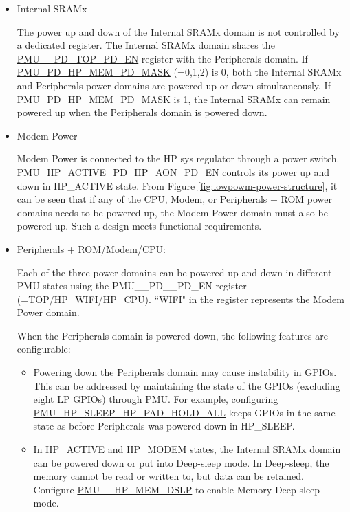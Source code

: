\documentclass[main\_\_EN.tex]{subfiles}
\begin{document}
\begin{itemize}
    \item Internal SRAMx

    The power up and down of the Internal SRAMx domain is not controlled by a dedicated register. The Internal SRAMx domain shares the \hyperref[fielddesc:PMUHPACTIVEPDTOPPDEN]{PMU\_\_PD\_TOP\_PD\_EN} register with the Peripherals domain. If \hyperref[fielddesc:PMUPDHPMEM0PDMASK]{PMU\_PD\_HP\_MEM\_PD\_MASK} (=0,1,2) is 0, both the Internal SRAMx and Peripherals power domains are powered up or down simultaneously. If \hyperref[fielddesc:PMUPDHPMEM0PDMASK]{PMU\_PD\_HP\_MEM\_PD\_MASK} is 1, the Internal SRAMx can remain powered up when the Peripherals domain is powered down.

    \item Modem Power

    Modem Power is connected to the HP sys regulator through a power switch. \hyperref[fielddesc:PMUHPACTIVEPDHPAONPDEN]{PMU\_HP\_ACTIVE\_PD\_HP\_AON\_PD\_EN} controls its power up and down in HP\_ACTIVE state. From Figure \ref{fig:lowpowm-power-structure}, it can be seen that if any of the CPU, Modem, or Peripherals + ROM power domains needs to be powered up, the Modem Power domain must also be powered up. Such a design meets functional requirements.

    \item Peripherals + ROM/Modem/CPU:

    Each of the three power domains can be powered up and down in different PMU states using the PMU\_\_PD\_\_PD\_EN register (=TOP/HP\_WIFI/HP\_CPU). ``WIFI" in the register represents the Modem Power domain.

    When the Peripherals domain is powered down, the following features are configurable:
        \begin{itemize}
        \item Powering down the Peripherals domain may cause instability in GPIOs. This can be addressed by maintaining the state of the GPIOs (excluding eight LP GPIOs) through PMU. For example, configuring \hyperref[fielddesc:PMUHPSLEEPHPPADHOLDALL]{PMU\_HP\_SLEEP\_HP\_PAD\_HOLD\_ALL} keeps GPIOs in the same state as before Peripherals was powered down in HP\_SLEEP.

        \item In HP\_ACTIVE and HP\_MODEM states, the Internal SRAMx domain can be powered down or put into Deep-sleep mode. In Deep-sleep, the memory cannot be read or written to, but data can be retained. Configure \hyperref[fielddesc:PMUHPACTIVEHPMEMDSLP]{PMU\_\_HP\_MEM\_DSLP} to enable Memory Deep-sleep mode.
        \end{itemize}


\end{itemize}
\end{document}
